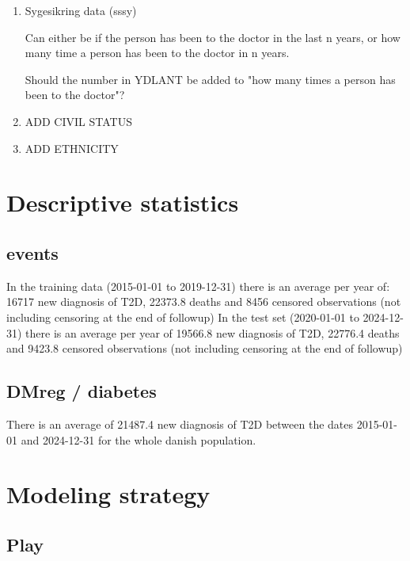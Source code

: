 \documentclass[11pt]{article}
\begin{document}
\begin{enumerate}
\item Sygesikring data (sssy)
\label{sec:org37fa94f}

Can either be if the person has been to the doctor in the last n years, or how many time a person has been to the doctor in n years.

Should the number in YDLANT be added to "how many times a person has been to the doctor"?


\item ADD CIVIL STATUS
\label{sec:org166ce05}

\item ADD ETHNICITY
\label{sec:orgc2b2854}
\end{enumerate}




\section{Descriptive statistics}
\label{sec:org7cce00a}

\subsection{events}
\label{sec:org2253e86}
In the training data (2015-01-01 to 2019-12-31) there is an average per year of: 16717 new diagnosis of T2D, 22373.8 deaths and 8456 censored observations (not including censoring at the end of followup)
In the test set (2020-01-01 to 2024-12-31) there is an average per year of 19566.8 new diagnosis of T2D, 22776.4 deaths and 9423.8 censored observations (not including censoring at the end of followup)



\subsection{DMreg / diabetes}
\label{sec:org2ad4df1}
There is an average of 21487.4 new diagnosis of T2D between the dates 2015-01-01 and 2024-12-31 for the whole danish population.



\section{Modeling strategy}
\label{sec:org895a647}

\subsection{Play}
\label{sec:org7e9521b}
\end{document}
